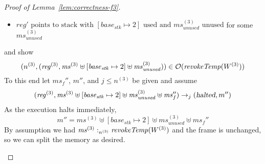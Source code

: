 \documentclass[a4paper]{article}
\newcommand{\var}[1]{\mathit{#1}}
\newcommand{\hs}{\var{ms}}
\newcommand{\ms}{\hs}
\newcommand{\start}{\var{base}}
\newcommand{\reg}{\var{reg}}
\newcommand{\heap}{\var{mem}}
\newcommand{\stk}{\var{stk}}
\newcommand{\halted}{\textsl{halted}}
\newcommand{\plainfun}[2]{
  \ifthenelse{\equal{#2}{}}
  {\mathit{#1}}
  {\mathit{#1}(#2)}
}
\newcommand{\revokeTemp}[1]{\plainfun{revokeTemp}{#1}}
\newcommand{\heapSat}[3][\heap]{#1 :_{#2} #3}
\newcommand{\memSat}[3][n]{\heapSat[#2]{#1}{#3}}
\newcommand{\observations}{\mathcal{O}}
\newcommand{\step}[1][]{\rightarrow_{#1}}
\begin{document}
\begin{proof}[Proof of Lemma~\ref{lem:correctness-f3}]
\begin{enumproof}
\begin{enumproof}
\begin{enumproof}
\begin{enumproof}
\begin{itemize}
            \item $\reg' \text{ points to stack with $[\start_\stk \mapsto 2]$ used and $\ms_{\mathit{unused}}^{(3)}$ unused}$ for some $\ms_{\mathit{unused}}^{(3)}$
            \end{itemize}
            and show
            \[
              (n^{(3)}, (\reg^{(3)},\ms^{(3)} \uplus [\start_\stk \mapsto 2] \uplus \ms_{\var{unused}}^{(3)})) \in \observations(\revokeTemp{W^{(3)}})
            \]
            To this end let $\ms_f''$, $m''$, and $j \leq n^{(3)}$ be given and assume
            \[
              (\reg^{(3)},\ms^{(3)} \uplus [\start_\stk \mapsto 2] \uplus \ms_{\var{unused}}^{(3)} \uplus \ms_f'') \step[j] (\halted,m'')
            \]
            As the execution halts immediately, 
            \[
              m'' = \ms^{(3)} \uplus [\start_\stk \mapsto 2] \uplus \ms_{\var{unused}}^{(3)} \uplus \ms_f''
            \]
            By assumption we had $\memSat[n^{(3)}]{\ms^{(3)}}{\revokeTemp{W^{(3)}}}$ and the frame is unchanged, so we can split the memory as desired.
        \end{enumproof}
      \end{enumproof}
    \end{enumproof}
  \end{enumproof}
\end{proof}
\end{document}
